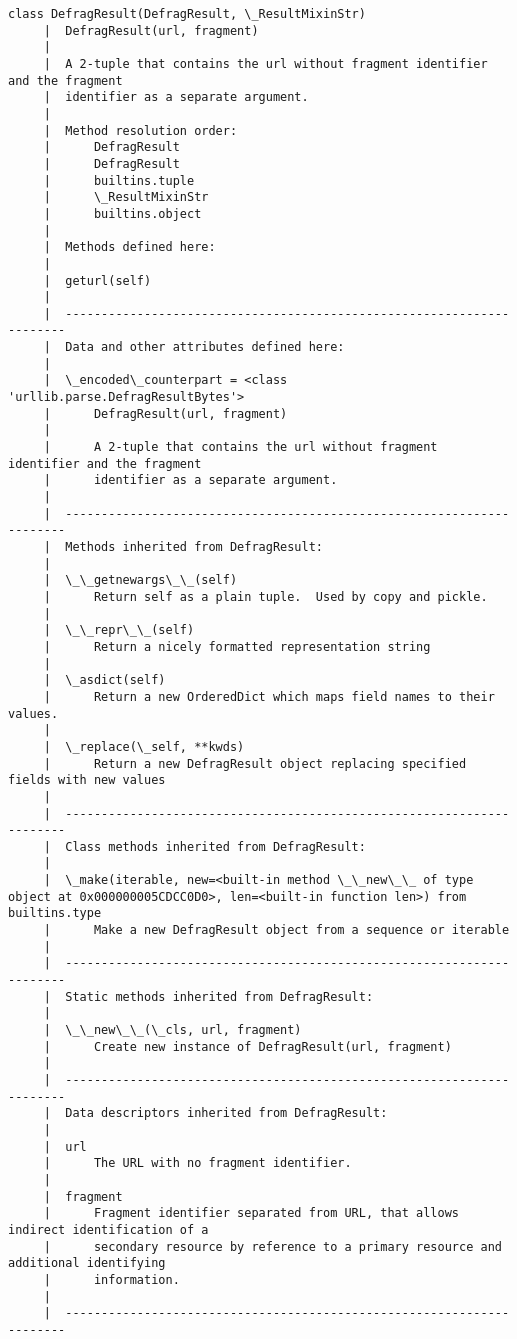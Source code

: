 \documentclass[11pt]{article}
\begin{document}
\begin{Verbatim}[commandchars=\\\{\}]
    class DefragResult(DefragResult, \_ResultMixinStr)
     |  DefragResult(url, fragment)
     |  
     |  A 2-tuple that contains the url without fragment identifier and the fragment
     |  identifier as a separate argument.
     |  
     |  Method resolution order:
     |      DefragResult
     |      DefragResult
     |      builtins.tuple
     |      \_ResultMixinStr
     |      builtins.object
     |  
     |  Methods defined here:
     |  
     |  geturl(self)
     |  
     |  ----------------------------------------------------------------------
     |  Data and other attributes defined here:
     |  
     |  \_encoded\_counterpart = <class 'urllib.parse.DefragResultBytes'>
     |      DefragResult(url, fragment)
     |      
     |      A 2-tuple that contains the url without fragment identifier and the fragment
     |      identifier as a separate argument.
     |  
     |  ----------------------------------------------------------------------
     |  Methods inherited from DefragResult:
     |  
     |  \_\_getnewargs\_\_(self)
     |      Return self as a plain tuple.  Used by copy and pickle.
     |  
     |  \_\_repr\_\_(self)
     |      Return a nicely formatted representation string
     |  
     |  \_asdict(self)
     |      Return a new OrderedDict which maps field names to their values.
     |  
     |  \_replace(\_self, **kwds)
     |      Return a new DefragResult object replacing specified fields with new values
     |  
     |  ----------------------------------------------------------------------
     |  Class methods inherited from DefragResult:
     |  
     |  \_make(iterable, new=<built-in method \_\_new\_\_ of type object at 0x000000005CDCC0D0>, len=<built-in function len>) from builtins.type
     |      Make a new DefragResult object from a sequence or iterable
     |  
     |  ----------------------------------------------------------------------
     |  Static methods inherited from DefragResult:
     |  
     |  \_\_new\_\_(\_cls, url, fragment)
     |      Create new instance of DefragResult(url, fragment)
     |  
     |  ----------------------------------------------------------------------
     |  Data descriptors inherited from DefragResult:
     |  
     |  url
     |      The URL with no fragment identifier.
     |  
     |  fragment
     |      Fragment identifier separated from URL, that allows indirect identification of a
     |      secondary resource by reference to a primary resource and additional identifying
     |      information.
     |  
     |  ----------------------------------------------------------------------

\end{Verbatim}
\end{document}
